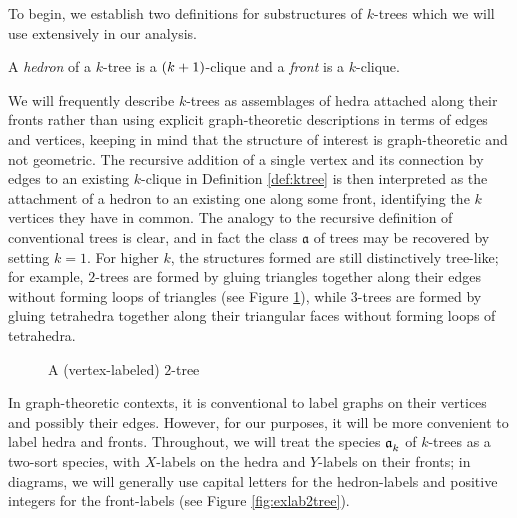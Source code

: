 \documentclass[distribution,draft]{brandiss} %
\numberwithin{section}{chapter}
\numberwithin{figure}{chapter}
\begin{document}
To begin, we establish two definitions for substructures of $k$-trees which we will use extensively in our analysis.
\begin{definition}
  \label{def:hedfront}
  A \emph{hedron} of a $k$-tree is a $\left( {k+1} \right)$-clique and a \emph{front} is a $k$-clique.
\end{definition}
We will frequently describe $k$-trees as assemblages of hedra attached along their fronts rather than using explicit graph-theoretic descriptions in terms of edges and vertices, keeping in mind that the structure of interest is graph-theoretic and not geometric.
The recursive addition of a single vertex and its connection by edges to an existing $k$-clique in Definition \ref{def:ktree} is then interpreted as the attachment of a hedron to an existing one along some front, identifying the $k$ vertices they have in common.
The analogy to the recursive definition of conventional trees is clear, and in fact the class $\mathfrak{a}$ of trees may be recovered by setting $k = 1$.
For higher $k$, the structures formed are still distinctively tree-like; for example, $2$-trees are formed by gluing triangles together along their edges without forming loops of triangles (see Figure \ref{fig:ex2tree}), while $3$-trees are formed by gluing tetrahedra together along their triangular faces without forming loops of tetrahedra.

\begin{figure}[htb]
  \centering
  \caption{A (vertex-labeled) $2$-tree}
  \label{fig:ex2tree}
\end{figure}

In graph-theoretic contexts, it is conventional to label graphs on their vertices and possibly their edges.
However, for our purposes, it will be more convenient to label hedra and fronts.
Throughout, we will treat the species $\mathfrak{a}_{k}^{}$ of $k$-trees as a two-sort species, with $X$-labels on the hedra and $Y$-labels on their fronts; in diagrams, we will generally use capital letters for the hedron-labels and positive integers for the front-labels (see Figure \ref{fig:exlab2tree}).
\end{document}
